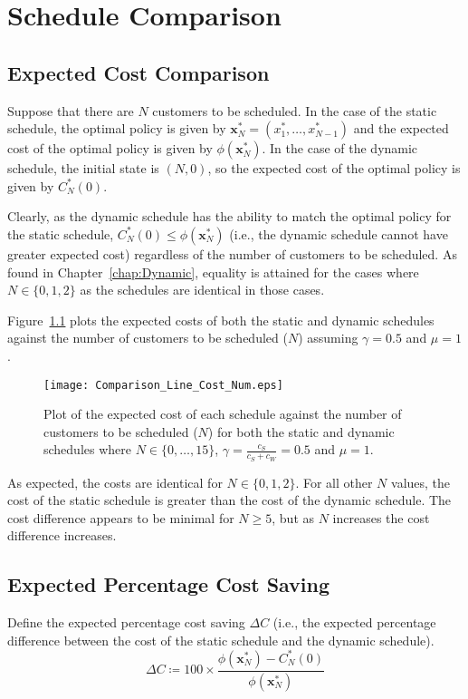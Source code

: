 \chapter{Schedule Comparison}
\label{chap:Comparison}
\section{Expected Cost Comparison}
Suppose that there are $N$ customers to be scheduled. In the case of the static schedule, the optimal policy is given by $\mathbf{x}_{N}^{*} = (x_{1}^{*}, \ldots, x_{N - 1}^{*})$ and the expected cost of the optimal policy is given by $\phi (\mathbf{x}_{N}^{*})$. In the case of the dynamic schedule, the initial state is $(N, 0)$, so the expected cost of the optimal policy is given by $C_{N}^{*} (0)$.

Clearly, as the dynamic schedule has the ability to match the optimal policy for the static schedule, $C_{N}^{*} (0) \leq \phi (\mathbf{x}_{N}^{*})$ (i.e., the dynamic schedule cannot have greater expected cost) regardless of the number of customers to be scheduled. As found in Chapter~\ref{chap:Dynamic}, equality is attained for the cases where $N \in \{ 0, 1, 2 \}$ as the schedules are identical in those cases.

Figure~\ref{Graph_Cost_Comparison} plots the expected costs of both the static and dynamic schedules against the number of customers to be scheduled ($N$) assuming $\gamma = 0.5$ and $\mu = 1$.
\begin{figure}[htb]
	\centering
	\texttt{[image: Comparison\_Line\_Cost\_Num.eps]}
	\caption{Plot of the expected cost of each schedule against the number of customers to be scheduled ($N$) for both the static and dynamic schedules where $N \in \{ 0, \ldots, 15 \}$, $\gamma = \frac{c_{S}}{c_{S} + c_{W}} = 0.5$ and $\mu = 1$.}
	\label{Graph_Cost_Comparison}
\end{figure}

As expected, the costs are identical for $N \in \{ 0, 1, 2 \}$. For all other $N$ values, the cost of the static schedule is greater than the cost of the dynamic schedule. The cost difference appears to be minimal for $N \geq 5$, but as $N$ increases the cost difference increases.

\section{Expected Percentage Cost Saving}
Define the expected percentage cost saving $\Delta C$ (i.e., the expected percentage difference between the cost of the static schedule and the dynamic schedule).
\begin{equation}
	\Delta C \coloneqq 100 \times \frac{\phi (\mathbf{x}_{N}^{*}) - C_{N}^{*} (0)}{\phi (\mathbf{x}_{N}^{*})}
\end{equation}

